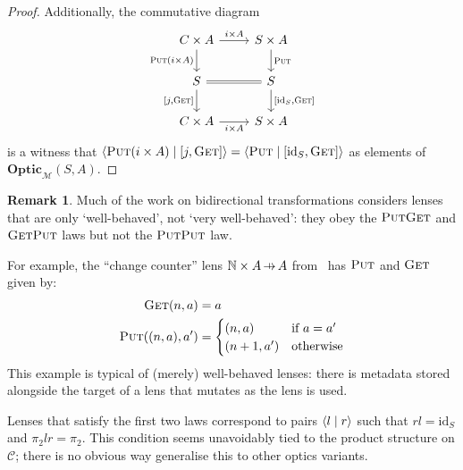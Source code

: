 \documentclass[11pt,a4paper]{article}
\theoremstyle{plain}
\theoremstyle{definition}
\newtheorem{remark}[theorem]{Remark}
\newcommand{\C}{\mathscr{C}}
\newcommand{\M}{\mathscr{M}}
\newcommand{\bN}{\mathbb{N}}
\newcommand{\Optic}{\mathbf{Optic}}
\newcommand{\id}{\mathrm{id}}
\newcommand{\rep}[2]{{\ensuremath \left\langle #1 \mid #2 \right\rangle}}
\newcommand{\fget}{\textsc{Get}}
\newcommand{\fput}{\textsc{Put}}
\newcommand{\hto}{\ensuremath{\,\mathaccent\shortmid\rightarrow\,}}
\newcommand{\todo}[1]{\textcolor{red}{\small #1}}
\begin{document}
\begin{proof}
  Additionally, the commutative diagram
  \[
    \begin{tikzcd}
      C \times A \ar[r, "i \times A"] \ar[d, "\fput (i \times A)", swap] & S \times A \ar[d, "\fput"] \\
      S \ar[r, equal] \ar[d, "{[j,\fget]}", swap] & S \ar[d, "{[\id_S, \fget]}"]  \\
      C \times A \ar[r, "i \times A", swap] & S \times A
    \end{tikzcd}
  \]
  is a witness that $\rep{\fput (i \times A)}{[j,\fget] } = \rep{\fput}{[\id_S, \fget] }$ as elements of $\Optic_\M(S, A)$.
\end{proof}


\begin{remark}
Much of the work on bidirectional transformations \cite{CombinatorsForBidirectionalTreeTransformations} considers lenses that are only `well-behaved', not `very well-behaved': they obey the $\fput\fget$ and $\fget\fput$ laws but not the $\fput\fput$ law.

For example, the ``change counter'' lens $\bN \times A \hto A$ from~\cite{AClearPictureOfLensLaws} has $\fput$ and $\fget$ given by:
  \begin{align*}
    \fget(n, a) &= a \\
    \fput((n, a), a') &= \begin{cases}
      (n, a) & \text{if } a = a' \\
      (n+1, a') & \text{otherwise}
    \end{cases}
  \end{align*}
  This example is typical of (merely) well-behaved lenses: there is metadata stored alongside the target of a lens that mutates as the lens is used.
  
Lenses that satisfy the first two laws correspond to pairs $\rep{l}{r}$ such that $rl = \id_S$ and $\pi_2lr = \pi_2$. This condition seems unavoidably tied to the product structure on $\C$; there is no obvious way generalise this to other optics variants.
\end{remark}
\end{document}
